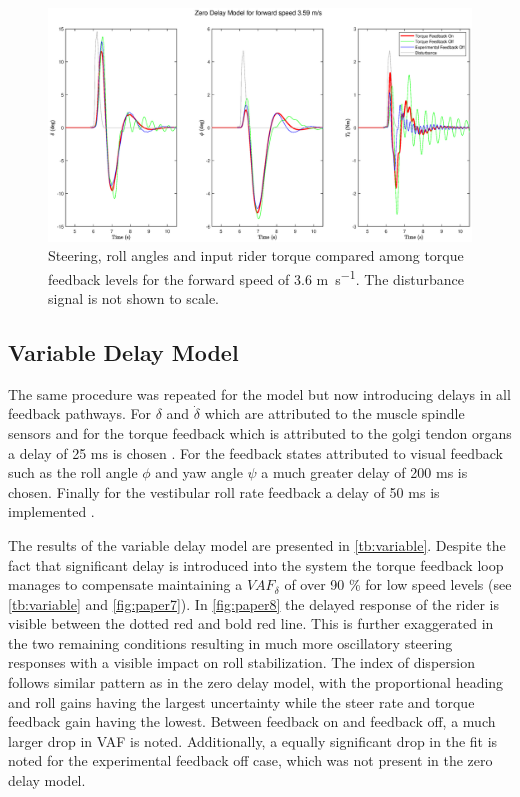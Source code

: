 \begin{figure}[!h]
    \centering
    \captionsetup{justification=centering,margin=2cm}

    \includegraphics[width=\textwidth]{images/no_delay_fb_compare.eps}
    \caption{Steering, roll angles and input rider torque compared among torque feedback levels  for the forward speed of 3.6 \si{\meter\per\second}. The disturbance signal is not shown  to scale.}
    \label{fig:paper6}
\end{figure}



\subsection{Variable Delay Model}
The same procedure was repeated for the model but now introducing  delays in all feedback pathways. For \ensuremath{\delta} and \ensuremath{\dot{\delta}} which are attributed to the muscle spindle sensors and for the torque feedback which is attributed to the golgi tendon organs  a delay of 25 \si{\milli\second} is chosen \cite{van2002identification,de2002adaptation}. For the feedback states attributed to visual feedback such as the roll angle \ensuremath{\phi} and yaw angle \ensuremath{\psi} a much greater delay of 200 \si{\milli\second} is chosen. Finally for  the vestibular roll rate feedback a delay of 50 \si{\milli\second} is implemented \cite{barnett2013vestibular}. 

The results of the variable delay model are presented in \cref{tb:variable}.  Despite the fact that significant delay is introduced into the system the torque feedback loop manages to compensate maintaining a \ensuremath{\mathit{VAF}_\delta} of over 90 \% for low speed levels (see \cref{tb:variable} and \cref{fig:paper7}). In \cref{fig:paper8} the delayed response of the rider is visible between the dotted red and bold red line. This is further exaggerated in the two remaining conditions resulting in much more oscillatory steering responses with a visible impact on roll stabilization. The index of dispersion follows similar pattern as in the zero delay model, with the proportional heading and roll gains having the largest uncertainty while the steer rate and  torque feedback gain having the lowest. Between feedback on and feedback off, a much larger drop in VAF is noted. Additionally, a equally significant drop in the fit is noted for the experimental feedback off case, which was not present in the zero delay model. 






